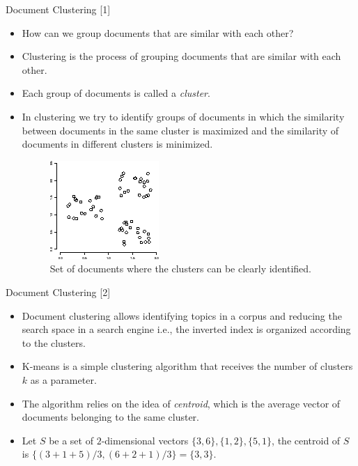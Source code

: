 \documentclass[handout]{beamer}
\begin{document}
\begin{frame}{Document Clustering [1]}
\footnotesize{
\begin{itemize}
 \item How can we group documents that are similar with each other?
 \item Clustering is the process of grouping documents that are similar with each other.
 \item Each group of documents is called a \emph{cluster}. 
 \item In clustering we try to identify groups of documents in which the similarity between documents in the same cluster is maximized and the similarity of documents in different clusters is minimized.
\begin{figure}[h!]
	\centering
	\includegraphics[scale=0.6]{pics/cluster.png}
	\caption{ Set of documents where the clusters can be clearly identified.}
\end{figure}
 
\end{itemize}


}
 
\end{frame}

\begin{frame}{Document Clustering [2]}
\footnotesize{
\begin{itemize}
 \item Document clustering allows identifying topics in a corpus and reducing the search space in a search engine i.e., the inverted index is organized according to the clusters. 
 \item K-means is a simple clustering algorithm that receives the number of clusters $k$ as a parameter.
 \item The algorithm relies on the idea of \emph{centroid}, which is the average vector of documents belonging to the same cluster.
 \item Let $S$ be a set of $2$-dimensional vectors $\{3,6\}, \{1,2\}, \{5,1\}$, the centroid of $S$ is $\{(3+1+5)/3,(6+2+1)/3\} = \{3,3\}$.

\end{itemize}
}
\end{frame}
\end{document}
